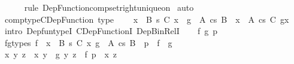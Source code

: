 \begin{isabellebody}
\ \ \ \ \isamarkupfalse%
\ {\isacharparenleft}{\kern0pt}rule\ Dep{\isacharunderscore}{\kern0pt}Function{\isacharunderscore}{\kern0pt}comp{\isacharunderscore}{\kern0pt}set{\isacharunderscore}{\kern0pt}right{\isacharunderscore}{\kern0pt}unique{\isacharunderscore}{\kern0pt}on{\isacharparenright}{\kern0pt}\isanewline
{}\isamarkupfalse%
\ auto%
\endisatagproof
{\isafoldproof}%
%
\isadelimproof
\isanewline
%
\endisadelimproof
\isanewline
{}\isamarkupfalse%
\ comp{\isacharunderscore}{\kern0pt}type{\isacharunderscore}{\kern0pt}CDep{\isacharunderscore}{\kern0pt}Function\ {\isacharbrackleft}{\kern0pt}type{\isacharbrackright}{\kern0pt}{\isacharcolon}{\kern0pt}\isanewline
\ \ {\isachardoublequoteopen}{\isacharparenleft}{\kern0pt}{\isasymcirc}{\isacharparenright}{\kern0pt}\ {\isacharcolon}{\kern0pt}\ {\isacharparenleft}{\kern0pt}{\isacharparenleft}{\kern0pt}x\ {\isacharcolon}{\kern0pt}\ B{\isacharparenright}{\kern0pt}\ {\isasymrightarrow}s\ C\ x{\isacharparenright}{\kern0pt}\ {\isasymRightarrow}\ {\isacharparenleft}{\kern0pt}g\ {\isacharcolon}{\kern0pt}\ A\ {\isasymrightarrow}cs\ B{\isacharparenright}{\kern0pt}\ {\isasymRightarrow}\ {\isacharparenleft}{\kern0pt}x\ {\isacharcolon}{\kern0pt}\ A{\isacharparenright}{\kern0pt}\ {\isasymrightarrow}cs\ C\ {\isacharparenleft}{\kern0pt}g{\isacharbackquote}{\kern0pt}x{\isacharparenright}{\kern0pt}{\isachardoublequoteclose}\isanewline
%
\isadelimproof
%
\endisadelimproof
%
\isatagproof
{}\isamarkupfalse%
\ {\isacharparenleft}{\kern0pt}intro\ Dep{\isacharunderscore}{\kern0pt}fun{\isacharunderscore}{\kern0pt}typeI\ CDep{\isacharunderscore}{\kern0pt}FunctionI\ Dep{\isacharunderscore}{\kern0pt}Bin{\isacharunderscore}{\kern0pt}RelI{\isacharparenright}{\kern0pt}\isanewline
\ \ \isamarkupfalse%
\ f\ g\ p\ \isamarkupfalse%
\ f{\isacharunderscore}{\kern0pt}g{\isacharunderscore}{\kern0pt}types{\isacharcolon}{\kern0pt}\ {\isachardoublequoteopen}f\ {\isacharcolon}{\kern0pt}\ {\isacharparenleft}{\kern0pt}x\ {\isacharcolon}{\kern0pt}\ B{\isacharparenright}{\kern0pt}\ {\isasymrightarrow}s\ C\ x{\isachardoublequoteclose}\ {\isachardoublequoteopen}g\ {\isacharcolon}{\kern0pt}\ A\ {\isasymrightarrow}cs\ B{\isachardoublequoteclose}\ \ {\isachardoublequoteopen}p\ {\isasymin}\ f\ {\isasymcirc}\ g{\isachardoublequoteclose}\isanewline
\ \ \isamarkupfalse%
\ \isamarkupfalse%
\ x\ y\ z\ \ {\isachardoublequoteopen}{\isasymlangle}x{\isacharcomma}{\kern0pt}\ y{\isasymrangle}\ {\isasymin}\ g{\isachardoublequoteclose}\ {\isachardoublequoteopen}{\isasymlangle}y{\isacharcomma}{\kern0pt}\ z{\isasymrangle}\ {\isasymin}\ f{\isachardoublequoteclose}\ {\isachardoublequoteopen}p\ {\isacharequal}{\kern0pt}\ {\isasymlangle}x{\isacharcomma}{\kern0pt}\ z{\isasymrangle}{\isachardoublequoteclose}\ \isamarkupfalse%

\end{isabellebody}
